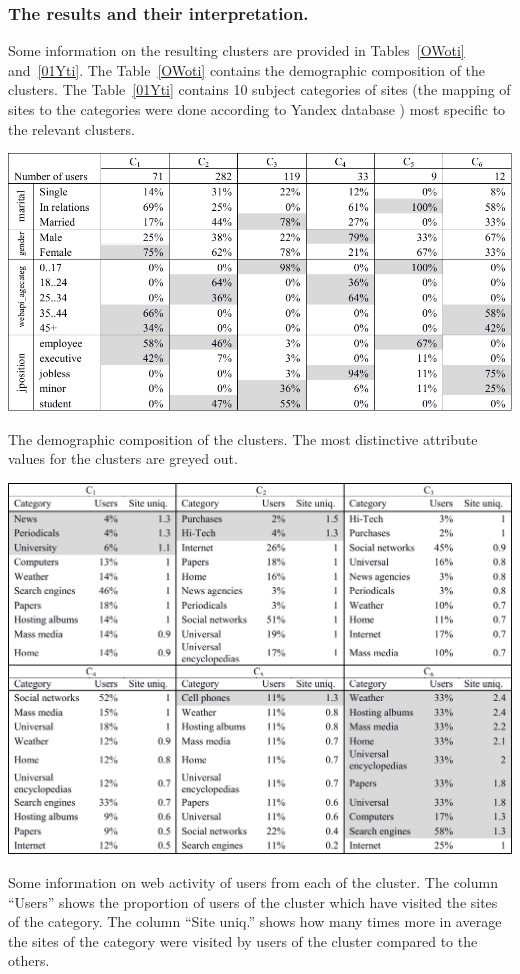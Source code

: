 \documentclass[runningheads,a4paper]{llncs}
\begin{document}
\subsubsection{The results and their interpretation.}

Some information on the resulting clusters are provided in Tables~\ref{OWoti} and~\ref{01Yti}. The Table~\ref{OWoti} contains the demographic composition of the clusters. The Table~\ref{01Yti} contains 10 subject categories of sites (the mapping of sites to the categories were done according to Yandex database \cite{yandex}) most specific to the relevant clusters.


\begin{table}
	\includegraphics[width=\linewidth]{t1.pdf}
	
	\caption{The demographic composition of the clusters. The most distinctive attribute values for the clusters are greyed out.}
	\label{OWoti}
\end{table}





\begin{table}
	\includegraphics[width=\linewidth]{t2.pdf}
	
	\caption{Some information on web activity of users from each of the cluster. The column ``Users'' shows the proportion of users of the cluster which have visited the sites of the category. The column ``Site uniq.'' shows how many times more in average the sites of the category were visited by users   of the cluster compared to the others.}
	\label{01Yti}
\end{table}
\end{document}
